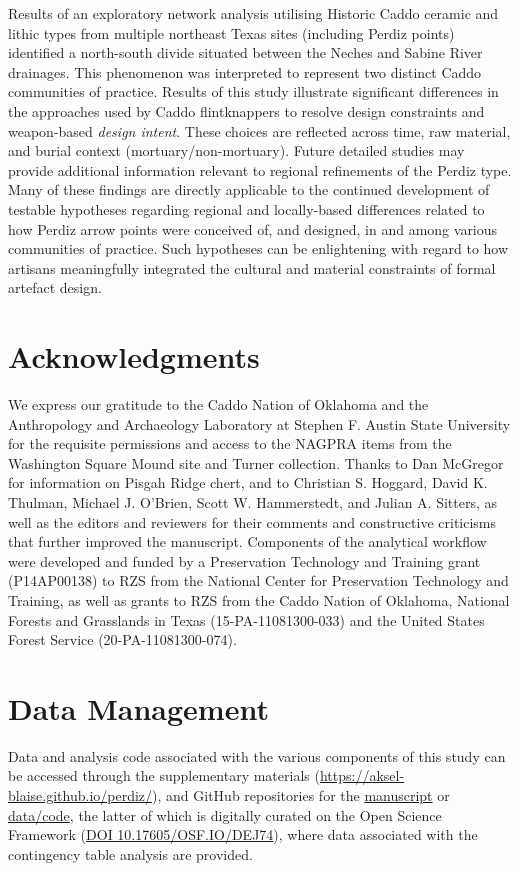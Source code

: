 \documentclass[review]{elsarticle}
\begin{document}
Results of an exploratory network analysis utilising Historic Caddo ceramic and lithic types from multiple northeast Texas sites (including Perdiz points) identified a north-south divide situated between the Neches and Sabine River drainages. This phenomenon was interpreted to represent two distinct Caddo communities of practice. Results of this study illustrate significant differences in the approaches used by Caddo flintknappers to resolve design constraints and weapon-based \textit{design intent}. These choices are reflected across time, raw material, and burial context (mortuary/non-mortuary). Future detailed studies may provide additional information relevant to regional refinements of the Perdiz type. Many of these findings are directly applicable to the continued development of testable hypotheses regarding regional and locally-based differences related to how Perdiz arrow points were conceived of, and designed, in and among various communities of practice. Such hypotheses can be enlightening with regard to how artisans meaningfully integrated the cultural and material constraints of formal artefact design.

\section*{Acknowledgments}

We express our gratitude to the Caddo Nation of Oklahoma and the Anthropology and Archaeology Laboratory at Stephen F. Austin State University for the requisite permissions and access to the NAGPRA items from the Washington Square Mound site and Turner collection. Thanks to Dan McGregor for information on Pisgah Ridge chert, and to Christian S. Hoggard, David K. Thulman, Michael J. O'Brien, Scott W. Hammerstedt, and Julian A. Sitters, as well as the editors and reviewers for their comments and constructive criticisms that further improved the manuscript. Components of the analytical workflow were developed and funded by a Preservation Technology and Training grant (P14AP00138) to RZS from the National Center for Preservation Technology and Training, as well as grants to RZS from the Caddo Nation of Oklahoma, National Forests and Grasslands in Texas (15-PA-11081300-033) and the United States Forest Service (20-PA-11081300-074).

\section*{Data Management}

Data and analysis code associated with the various components of this study can be accessed through the supplementary materials (\href{https://aksel-blaise.github.io/perdiz/}{https://aksel-blaise.github.io/perdiz/}), and GitHub repositories for the \href{https://github.com/aksel-blaise/perdiz-manu}{manuscript} or \href{https://github.com/aksel-blaise/perdiz}{data/code}, the latter of which is digitally curated on the Open Science Framework (\href{https://osf.io/dej74/}{DOI 10.17605/OSF.IO/DEJ74}), where data associated with the contingency table analysis are provided.


\end{document}
